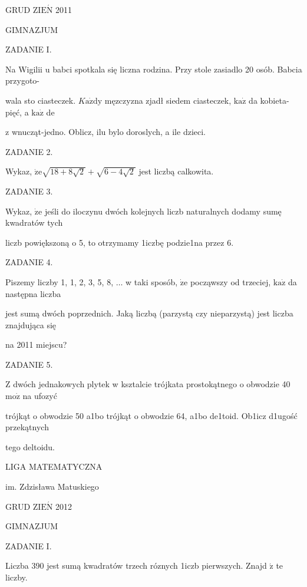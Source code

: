 \documentclass[a4paper,12pt]{article}
\begin{document}
GRUD Z$\mathrm{I}\mathrm{E}\acute{\mathrm{N}}$ 2011

GIMNAZJUM

ZADANIE I.

Na Wigilii $\mathrm{u}$ babci spotkala się liczna rodzina. Przy stole zasiadlo 20 osób. Babcia przygoto-

wala sto ciasteczek. $K\mathrm{a}\dot{\mathrm{z}}\mathrm{d}\mathrm{y}$ męzczyzna zjadł siedem ciasteczek, $\mathrm{k}\mathrm{a}\dot{\mathrm{z}}$ da kobieta- pięć, a $\mathrm{k}\mathrm{a}\dot{\mathrm{z}}$ de

z wnucząt-jedno. Oblicz, ilu bylo doroslych, a ile dzieci.

ZADANIE 2.

Wykaz, $\dot{\mathrm{z}}\mathrm{e}\sqrt{18+8\sqrt{2}}+\sqrt{6-4\sqrt{2}}$ jest liczbą calkowita.

ZADANIE 3.

Wykaz, $\dot{\mathrm{z}}\mathrm{e}$ jeśli do iloczynu dwóch kolejnych liczb naturalnych dodamy sumę kwadratów tych

liczb powiększoną o 5, to otrzymamy 1iczbę podzie1na przez 6.

ZADANIE 4.

Piszemy liczby 1, 1, 2, 3, 5, 8, $\ldots$ w taki sposób, $\dot{\mathrm{z}}\mathrm{e}$ począwszy od trzeciej, $\mathrm{k}\mathrm{a}\dot{\mathrm{z}}$ da następna liczba

jest sumą dwóch poprzednich. Jaką liczbą (parzystą czy nieparzystą) jest liczba znajdująca się

na 2011 miejscu?

ZADANIE 5.

$\mathrm{Z}$ dwóch jednakowych plytek w ksztalcie trójkata prostokątnego o obwodzie 40 $\mathrm{m}\mathrm{o}\dot{\mathrm{z}}$ na ufozyć

trójkąt o obwodzie 50 a1bo trójkąt o obwodzie 64, a1bo de1toid. Ob1icz d1ugość przekątnych

tego deltoidu.






LIGA MATEMATYCZNA

im. Zdzisława Matuskiego

GRUD Z$\mathrm{I}\mathrm{E}\acute{\mathrm{N}}$ 2012

GIMNAZJUM

ZADANIE I.

Liczba 390 jest sumą kwadratów trzech róznych 1iczb pierwszych. Znajd $\acute{\mathrm{z}}$ te liczby.
\end{document}
